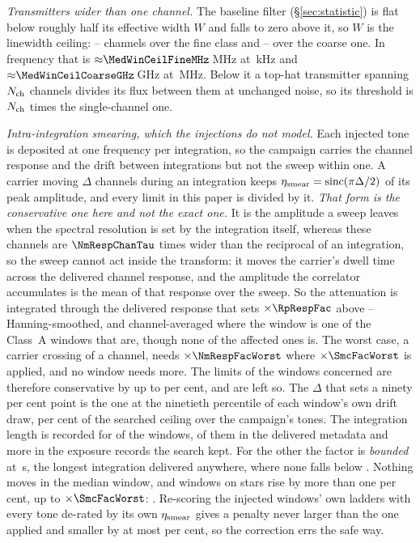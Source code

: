 \emph{Transmitters wider than one channel.} The baseline filter
(\S\ref{sec:statistic}) is flat below roughly half its effective width $W$ and
falls to zero above it, so $W$ is the linewidth ceiling:
\MedWinFineLo--\MedWinFineHi{} channels over the fine class and
\MedWinCoarseLo--\MedWinCoarseHi{} over the coarse one. In frequency that is
${\approx}\MedWinCeilFineMHz$\,MHz at \ChanFineKHz\,kHz and
${\approx}\MedWinCeilCoarseGHz$\,GHz at \ChanCoarseMHz\,MHz. Below it a
top-hat transmitter spanning $N_{\rm ch}$ channels divides its flux between
them at unchanged noise, so its threshold is $N_{\rm ch}$ times the
single-channel one.

\emph{Intra-integration smearing, which the injections do not model.} Each
injected tone is deposited at one frequency per integration, so the campaign
carries the channel response and the drift between integrations but not the
sweep within one. A carrier moving $\Delta$ channels during an integration
keeps $\eta_{\rm smear}=\mathrm{sinc}(\pi\Delta/2)$ of its peak amplitude, and
every limit in this paper is divided by it. \emph{That form is the
conservative one here and not the exact one.} It is the amplitude a sweep
leaves when the spectral resolution is set by the integration itself, whereas
these channels are $\NmRespChanTau$ times wider than the reciprocal of an
integration, so the sweep cannot act inside the transform: it moves the
carrier's dwell time across the delivered channel response, and the amplitude
the correlator accumulates is the mean of that response over the sweep.
So the attenuation is integrated through the delivered response that sets
$\times\RpRespFac$ above -- Hanning-smoothed, and channel-averaged where the
window is one of the \NmRespNAvgA{} Class~A windows that are, though none of
the affected ones is. The worst case, a carrier crossing
\NmRespDeltaWorst{} of a channel, needs $\times\NmRespFacWorst$ where
$\times\SmcFacWorst$ is applied, and no window needs more. The limits of the
\SmcNAbove{} windows concerned are
therefore conservative by up to \NmRespOverPct{} per cent, and are left so.
The $\Delta$ that sets a ninety
per cent point is the one at the ninetieth percentile of each window's own
drift draw, \SmcQninePct{} per cent of the searched ceiling over the
campaign's \SmcNTone{} tones. The integration length is recorded for
\SmcNMeas{} of the \NWindows{} windows, \CsNDumpWin{} of them in the delivered
metadata and \SmNRecov{} more in the exposure records the search kept. For the
other \SmcNBound{} the factor is \emph{bounded} at \SmcDtCeil\,s, the longest
integration delivered anywhere, where none falls below \SmcBoundEta.
Nothing moves in the median window, and \SmcNAbove{} windows on
\SmcNAboveStar{} stars rise by more than one per cent, up to
$\times\SmcFacWorst$: \SmcAboveStars. Re-scoring the \SmcValNWin{} injected
windows' own ladders with every tone de-rated by its own $\eta_{\rm smear}$
gives a penalty never larger than the one applied and smaller by at most
\SmcValWorstPct{} per cent, so the correction errs the safe way.

